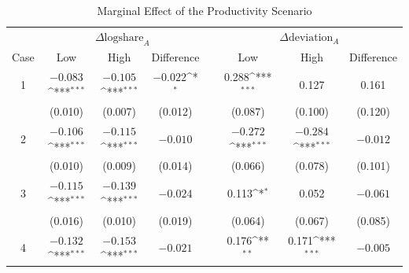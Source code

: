 \documentclass[smallcondensed]{svjour3}
\begin{document}
%
\clearpage
%
\begin{table}[ht]
\centering
\caption{Marginal Effect of the Productivity Scenario}\label{tab:marginalscen}
{\footnotesize
\def\sym#1{\ifmmode^{#1}\else\(^{#1}\)\fi}
\begin{tabular}{cccccccc}\\[0.5ex]\hline
                            & \multicolumn{3}{c}{$\Delta\mbox{logshare}_A$}                                             &   & \multicolumn{3}{c}{$\Delta\mbox{deviation}_A$}                                            \\\cline{2-4}\cline{6-8}
   \multicolumn{1}{c}{Case} & \multicolumn{1}{c}{Low}   & \multicolumn{1}{c}{High}   & \multicolumn{1}{c}{Difference}   &   & \multicolumn{1}{c}{Low}   & \multicolumn{1}{c}{High}   & \multicolumn{1}{c}{Difference}   \\\hline\hline
   1                        & $-0.083$\sym{***}         & $-0.105$\sym{***}          & $-0.022$\sym{*}                  &   &   0.288\sym{***}          &   0.127                    &   0.161                          \\
                            &  (0.010)                  &  (0.007)                   &  (0.012)                         &   &  (0.087)                  &  (0.100)                   &  (0.120)                         \\
   2                        & $-0.106$\sym{***}         & $-0.115$\sym{***}          & $-0.010$                         &   & $-0.272$\sym{***}         & $-0.284$\sym{***}          & $-0.012$                         \\
                            &  (0.010)                  &  (0.009)                   &  (0.014)                         &   &  (0.066)                  &  (0.078)                   &  (0.101)                         \\
   3                        & $-0.115$\sym{***}         & $-0.139$\sym{***}          & $-0.024$                         &   &   0.113\sym{*}            &   0.052                    & $-0.061$                         \\
                            &  (0.016)                  &  (0.010)                   &  (0.019)                         &   &  (0.064)                  &  (0.067)                   &  (0.085)                         \\
   4                        & $-0.132$\sym{***}         & $-0.153$\sym{***}          & $-0.021$                         &   &   0.176\sym{**}           &   0.171\sym{***}           & $-0.005$                         \\

\end{tabular}}
\end{table}
\end{document}
